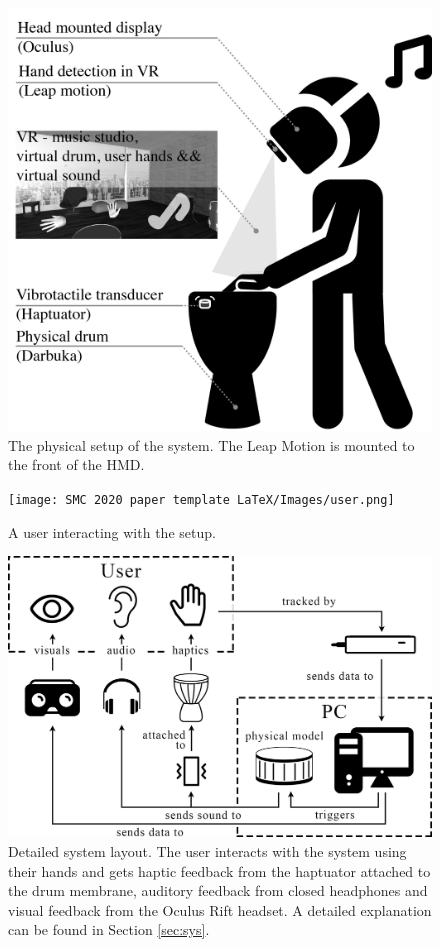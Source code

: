 \documentclass{article}
\begin{document}
\begin{figure}[ht]
\includegraphics[width=1.0\columnwidth]{SMC 2020 paper template LaTeX/Images/VRDrumSetup.png}
\caption{The physical setup of the system. The Leap Motion is mounted to the front of the HMD.}
\centering
\label{fig:userOverview}
\end{figure}

\begin{figure}[t]
\texttt{[image: SMC 2020 paper template LaTeX/Images/user.png]}
\caption{A user interacting with the setup.}
\centering
\label{fig:user}
\end{figure}
\begin{figure}[t]
\includegraphics[width=1.0\columnwidth]{Images/systemlayout-updated.png}
\caption{Detailed system layout. The user interacts with the system using their hands and gets haptic feedback from the haptuator attached to the drum membrane, auditory feedback from closed headphones and visual feedback from the Oculus Rift headset. A detailed explanation can be found in Section \ref{sec:sys}.}
\centering
\label{fig:systemLayout}
\end{figure}
\end{document}
